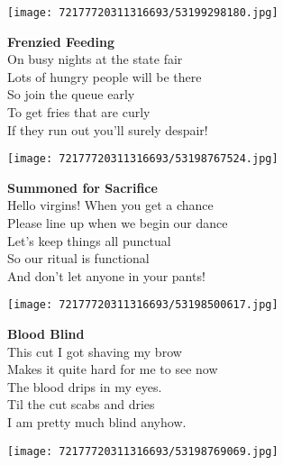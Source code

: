 \documentclass[10pt,letterpaper]{article}
\begin{document}
\begin{center}
\texttt{[image: 72177720311316693/53199298180.jpg]}
\end{center}

\begin{center}
\textbf{Frenzied Feeding}\\
\vskip 0.2in
On busy nights at the state fair\\
Lots of hungry people will be there\\
So join the queue early\\
To get fries that are curly\\
If they run out you'll surely despair!\\
\end{center}
\pagebreak

\begin{center}\texttt{[image: 72177720311316693/53198767524.jpg]}
\end{center}
\begin{center}
\textbf{Summoned for Sacrifice}\\
\vskip 0.2in
Hello virgins!  When you get a chance\\
Please line up when we begin our dance\\
Let's keep things all punctual\\
So our ritual is functional\\
And don't let anyone in your pants!\\
\end{center}
\pagebreak

\begin{center}\texttt{[image: 72177720311316693/53198500617.jpg]}
\end{center}
\begin{center}
\textbf{Blood Blind}\\
\vskip 0.2in
This cut I got shaving my brow\\
Makes it quite hard for me to see now\\
The blood drips in my eyes.\\
Til the cut scabs and dries\\
I am pretty much blind anyhow.\\
\end{center}
\pagebreak

\begin{center}
\texttt{[image: 72177720311316693/53198769069.jpg]}
\end{center}
\end{document}
